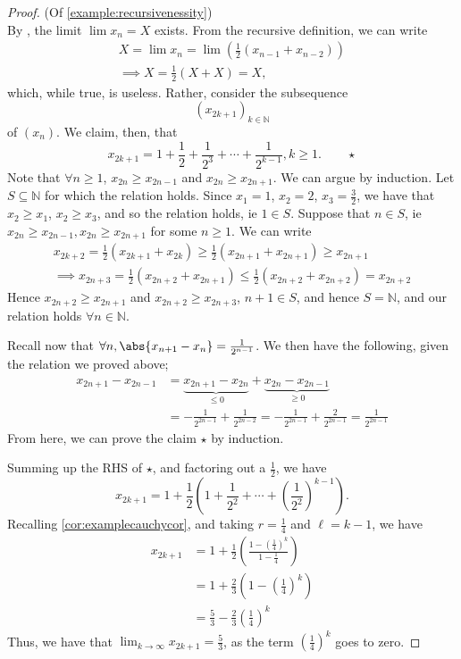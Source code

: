 \documentclass[12pt]{article}
\begin{document}

\begin{proof}(Of \cref{example:recursivenessity})\\
  By , the limit $\lim x_{n} = X$ exists. From the recursive definition, we can write \begin{align*}
    X = \lim x_n = \lim (\frac{1}{2}(x_{n-1} + x_{n-2}))\\
    \implies X = \frac{1}{2}(X+ X) = X,
  \end{align*}
  which, while true, is useless. Rather, consider the subsequence $$(x_{2k+1})_{k\in\mathbb{N}}$$ of $(x_n)$. We claim, then, that \[x_{2k+1} = 1 + \frac{1}{2} + \frac{1}{2^3} + \cdots + \frac{1}{2^{k-1}}, k \geq 1. \qquad \star\] Note that $\forall n \geq 1$, $x_{2n} \geq x_{2n-1}$ and $x_{2n} \geq x_{2n+1}$. We can argue by induction. Let $S \subseteq \mathbb{N}$ for which the relation holds. Since $x_1 = 1$, $x_2 = 2$, $x_3 = \frac{3}{2}$, we have that $x_{2} \geq x_1$, $x_2 \geq x_3$, and so the relation holds, ie $1 \in S$. Suppose that $n \in S$, ie $x_{2n} \geq x_{2n-1}, x_{2n} \geq x_{2n+1}$ for some $n \geq 1$. We can write \begin{align*}
    x_{2k+2} = \frac{1}{2}(x_{2k+1} + x_{2k}) \geq \frac{1}{2}(x_{2n+1} + x_{2n+1}) \geq x_{2n+1}\\
    \implies x_{2n+3} = \frac{1}{2}(x_{2n+2} + x_{2n+1}) \leq \frac{1}{2}(x_{2n+2}+x_{2n+2}) = x_{2n+2}
  \end{align*}
  Hence $x_{2n+2} \geq x_{2n+1}$ and $x_{2n+2} \geq x_{2n+3}$, $n+1 \in S$, and hence $S = \mathbb{N}$, and our relation holds $\forall n \in \mathbb{N}$.

  Recall now that $\forall n, \abs{x_{n+1} - x_n} = \frac{1}{2^{n-1}}$. We then have the following, given the relation we proved above; \begin{align*}
    x_{2n+1} - x_{2n-1} &= \underbrace{x_{2n+1} - x_{2n}}_{\leq 0} + \underbrace{x_{2n} - x_{2n-1}}_{\geq 0}\\
    &= -\frac{1}{2^{2n-1}} + \frac{1}{2^{2n-2}} = -\frac{1}{2^{2n-1}}  +\frac{2}{2^{2n-1}} = \frac{1}{2^{2n-1}}
  \end{align*}
  From here, we can prove the claim $\star$ by induction.

  Summing up the RHS of $\star$, and factoring out a $\frac{1}{2}$, we have \[
  x_{2k+1} = 1 + \frac{1}{2}\left(1 + \frac{1}{2^2} + \cdots + \left(\frac{1}{2^2}\right)^{k-1}\right).
  \]
  Recalling \cref{cor:examplecauchycor}, and taking $r = \frac{1}{4}$ and $\ell = k - 1$, we have \begin{align*}
    x_{2k+1} &=1+ \frac{1}{2}\left(\frac{1 - \left(\frac{1}{4}\right)^k}{1 - \frac{1}{4}}\right)\\
    &= 1 + \frac{2}{3}\left(1 - \left(\frac{1}{4}\right)^k\right)\\
    & = \frac{5}{3} - \frac{2}{3}\left(\frac{1}{4}\right)^k
  \end{align*}
  Thus, we have that $\lim_{k\to\infty} x_{2k+1} = \frac{5}{3}$, as the term $(\frac{1}{4})^k$ goes to zero.


\end{proof}
\end{document}
